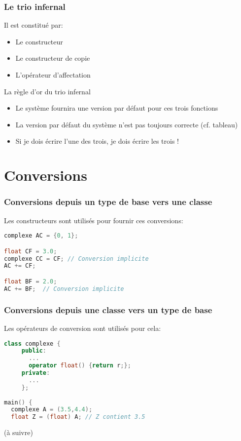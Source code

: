 \documentclass{beamer}
\begin{document}
\begin{frame}[fragile=singleslide,shrink=20]
\frametitle {Le trio infernal}

Il est constitué par:
\begin{itemize}
\item{Le constructeur}
\item{Le constructeur de copie}
\item{L'opérateur d'affectation}
\end{itemize}

\begin{block}{La règle d'or du trio infernal}
\begin{itemize}
\item{Le système fournira une version par défaut pour ces trois fonctions}
\item{La version par défaut du système n'est pas toujours correcte (cf. tableau)}
\item{Si je dois écrire l'une des trois, je dois écrire les trois !}
\end{itemize}
\end{block}
\end{frame}

\section{Conversions}
\begin{frame}[fragile=singleslide,shrink=20]
\frametitle {Conversions depuis un type de base vers une classe}

Les constructeurs sont utilisés pour fournir ces conversions:
\begin{lstlisting}[language=c++]
complexe AC = {0, 1};

float CF = 3.0;
complexe CC = CF; // Conversion implicite
AC += CF;

float BF = 2.0;
AC += BF;  // Conversion implicite
\end{lstlisting}
\end{frame}

\begin{frame}[fragile=singleslide,shrink=20]
\frametitle {Conversions depuis une classe vers un type de base}

Les opérateurs de conversion sont utilisés pour cela:
\begin{lstlisting}[language=c++]
class complexe {
     public:
       ...
       operator float() {return r;};
     private:
       ...
     };
     
main() {
  complexe A = (3.5,4.4);
  float Z = (float) A; // Z contient 3.5
\end{lstlisting}
\end{frame}

\begin{frame}
(à suivre)
\end{frame}
\end{document}
